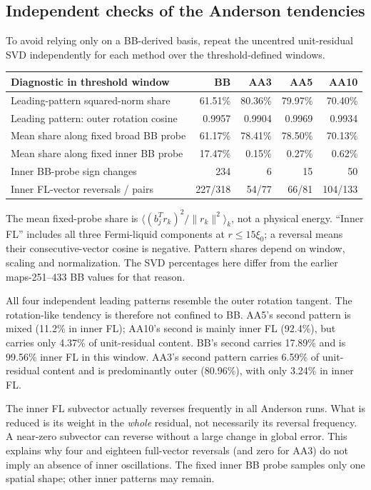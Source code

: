 \documentclass[11pt,a4paper]{article}
\begin{document}
\subsection{Independent checks of the Anderson tendencies}
To avoid relying only on a BB-derived basis, repeat the uncentred unit-residual
SVD independently for each method over the threshold-defined windows.
\begin{center}
\begin{tabular}{lrrrr}
\toprule
Diagnostic in threshold window & BB & AA3 & AA5 & AA10\\
\midrule
Leading-pattern squared-norm share &61.51\%&80.36\%&79.97\%&70.40\%\\
Leading pattern: outer rotation cosine &0.9957&0.9904&0.9969&0.9934\\
Mean share along fixed broad BB probe &61.17\%&78.41\%&78.50\%&70.13\%\\
Mean share along fixed inner BB probe &17.47\%&0.15\%&0.27\%&0.62\%\\
Inner BB-probe sign changes &234&6&15&50\\
Inner FL-vector reversals / pairs &227/318&54/77&66/81&104/133\\
\bottomrule
\end{tabular}
\end{center}
The mean fixed-probe share is
$\langle(b_j^Tr_k)^2/\|r_k\|^2\rangle_k$, not a physical energy.
``Inner FL'' includes all three Fermi-liquid components at $r\leq15\xi_0$;
a reversal means their consecutive-vector cosine is negative. Pattern shares
depend on window, scaling and normalization. The SVD percentages here differ
from the earlier maps-251--433 BB values for that reason.

All four independent leading patterns resemble the outer rotation tangent.
The rotation-like tendency is therefore not confined to BB. AA5's second
pattern is mixed (11.2\% in inner FL); AA10's second is mainly inner FL
(92.4\%), but carries only 4.37\% of unit-residual content. BB's second
carries 17.89\% and is 99.56\% inner FL in this window. AA3's second pattern
carries 6.59\% of unit-residual content and is predominantly outer (80.96\%),
with only 3.24\% in inner FL.

The inner FL subvector actually reverses frequently in all Anderson runs.
What is reduced is its weight in the \emph{whole} residual, not necessarily
its reversal frequency. A near-zero subvector can reverse without a large
change in global error. This explains why four and eighteen full-vector
reversals (and zero for AA3) do not imply an absence of inner oscillations. The fixed inner BB
probe samples only one spatial shape; other inner patterns may remain.
\end{document}
